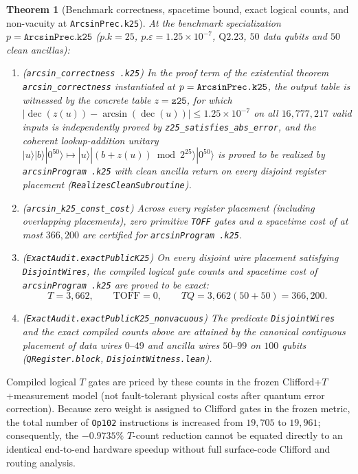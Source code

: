 \documentclass[11pt,a4paper]{article}
\newtheorem{theorem}{Theorem}[section]
\theoremstyle{definition}
\theoremstyle{remark}
\begin{document}
\begin{theorem}[Benchmark correctness, spacetime bound, exact logical counts, and non-vacuity at \texttt{ArcsinPrec.k25}]
\label{thm:arcsin}
At the benchmark specialization \(p = \texttt{ArcsinPrec.k25}\) (\(p.k = 25\), \(p.\varepsilon = 1.25 \times 10^{-7}\), \(\mathrm{Q}2.23\), \(50\) data qubits and \(50\) clean ancillas):
\begin{enumerate}
\item \textup{(\texttt{arcsin\_correctness .k25})} In the proof term of the existential theorem \texttt{arcsin\_\allowbreak correctness} instantiated at \(p = \texttt{Arcsin\allowbreak Prec.k25}\), the output table is witnessed by the concrete table \(z = \texttt{z25}\), for which \(|\operatorname{dec}(z(u)) - \arcsin(\operatorname{dec}(u))| \le 1.25 \times 10^{-7}\) on all \(16{,}777{,}217\) valid inputs is independently proved by \texttt{z25\_\allowbreak satisfies\_\allowbreak abs\_\allowbreak error}, and the coherent lookup-addition unitary \(|u\rangle|b\rangle|0^{50}\rangle \mapsto |u\rangle|(b + z(u)) \bmod 2^{25}\rangle|0^{50}\rangle\) is proved to be realized by \texttt{arcsinProgram .k25} with clean ancilla return on every disjoint register placement (\texttt{Realizes\allowbreak Clean\allowbreak Subroutine}).
\item \textup{(\texttt{arcsin\_k25\_const\_cost})} Across every register placement (including overlapping placements), zero primitive \texttt{TOFF} gates and a spacetime cost of at most \(366{,}200\) are certified for \texttt{arcsinProgram .k25}.
\item \textup{(\texttt{ExactAudit.\allowbreak exact\allowbreak PublicK25})} On every disjoint wire placement satisfying \texttt{Disjoint\allowbreak Wires}, the compiled logical gate counts and spacetime cost of \texttt{arcsinProgram .k25} are proved to be exact:
\[
  T = 3{,}662, \qquad \mathrm{TOFF} = 0, \qquad TQ = 3{,}662(50 + 50) = 366{,}200.
\]
\item \textup{(\texttt{ExactAudit.\allowbreak exactPublicK25\_nonvacuous})} The predicate \texttt{DisjointWires} and the exact compiled counts above are attained by the canonical contiguous placement of data wires \(0\text{--}49\) and ancilla wires \(50\text{--}99\) on \(100\) qubits (\texttt{QRegister.block}, \texttt{DisjointWitness.lean}).
\end{enumerate}
\end{theorem}

Compiled logical \(T\) gates are priced by these counts in the frozen Clifford+\(T\)+measurement model (not fault-tolerant physical costs after quantum error correction). Because zero weight is assigned to Clifford gates in the frozen metric, the total number of \texttt{Op102} instructions is increased from \(19{,}705\) to \(19{,}961\); consequently, the \(-0.9735\%\) \(T\)-count reduction cannot be equated directly to an identical end-to-end hardware speedup without full surface-code Clifford and routing analysis.
\end{document}
